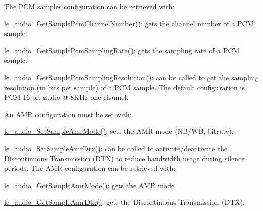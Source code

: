 The P\+C\+M samples configuration can be retrieved with\+:
\begin{DoxyItemize}
\item \hyperlink{le__audio__interface_8h_a40bf3633c3050a7526a100562edc97f9}{le\+\_\+audio\+\_\+\+Get\+Sample\+Pcm\+Channel\+Number()}\+: gets the channel number of a P\+C\+M sample.
\item \hyperlink{le__audio__interface_8h_a80fb48632ce8f638cea4a3e5d333d66f}{le\+\_\+audio\+\_\+\+Get\+Sample\+Pcm\+Sampling\+Rate()}\+: gets the sampling rate of a P\+C\+M sample.
\item \hyperlink{le__audio__interface_8h_a70b9f904ce225aad4fb80b8b24a1f92a}{le\+\_\+audio\+\_\+\+Get\+Sample\+Pcm\+Sampling\+Resolution()}\+: can be called to get the sampling resolution (in bits per sample) of a P\+C\+M sample. The default configuration is P\+C\+M 16-\/bit audio @ 8\+K\+Hz one channel.
\end{DoxyItemize}

An A\+M\+R configuration must be set with\+:
\begin{DoxyItemize}
\item \hyperlink{le__audio__interface_8h_a18600cdbd3995c9c2ca24f9b15991f7d}{le\+\_\+audio\+\_\+\+Set\+Sample\+Amr\+Mode()}\+: sets the A\+M\+R mode (N\+B/\+W\+B, bitrate).
\item \hyperlink{le__audio__interface_8h_a5932f51fb1398cc2442c8bb765ca4071}{le\+\_\+audio\+\_\+\+Set\+Sample\+Amr\+Dtx()}\+: can be called to activate/deactivate the Discontinuous Transmission (D\+T\+X) to reduce bandwidth usage during silence periods. The A\+M\+R configuration can be retrieved with\+:
\item \hyperlink{le__audio__interface_8h_aa293e15d41f7c1c384053947b5a4dbea}{le\+\_\+audio\+\_\+\+Get\+Sample\+Amr\+Mode()}\+: gets the A\+M\+R mode.
\item \hyperlink{le__audio__interface_8h_ab26d633ee83aed52dae838cb9d721f87}{le\+\_\+audio\+\_\+\+Get\+Sample\+Amr\+Dtx()}\+: gets the Discontinuous Transmission (D\+T\+X).
\end{DoxyItemize}

